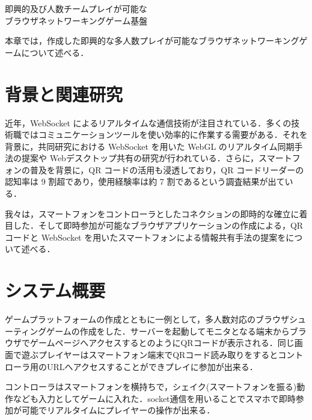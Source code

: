 \chapterhead
{即興的及び人数チームプレイが可能な\\ブラウザネットワーキングゲーム基盤}

{本章では，作成した即興的な多人数プレイが可能なブラウザネットワーキングゲームについて述べる．}



\section{背景と関連研究}

近年，WebSocket\cite{websocket} によるリアルタイムな通信技術が注目されている．多くの技術職ではコミュニケーションツールを使い効率的に作業する需要がある．それを背景に，共同研究における WebSocket を用いた WebGL のリアルタイム同期手法の提案\cite{websocket_webgl}や Webデスクトップ共有の研究が行われている\cite{websocket_desktop}．さらに，スマートフォンの普及\cite{smartphone_share}を背景に，QR コード\cite{qrcode}の活用も浸透しており，QR コードリーダーの認知率は 9 割超であり，使用経験率は約 7 割であるという調査結果が出ている\cite{qrcoderesearch}．

我々は，スマートフォンをコントローラとしたコネクションの即時的な確立に着目した．そして即時参加が可能なブラウザアプリケーションの作成による，QR コードと WebSocket を用いたスマートフォンによる情報共有手法の提案をについて述べる\cite{ec2015}．

\section{システム概要}

ゲームプラットフォームの作成とともに一例として，多人数対応のブラウザシューティングゲームの作成をした．サーバーを起動してモニタとなる端末からブラウザでゲームページへアクセスするとのようにQRコードが表示される．同じ画面で遊ぶプレイヤーはスマートフォン端末でQRコード読み取りをするとコントローラ用のURLへアクセスすることができプレイに参加が出来る．

コントローラはスマートフォンを横持ちで，シェイク(スマートフォンを振る)動作なども入力としてゲームに入れた．socket通信\cite{webpagesocketio}を用いることでスマホで即時参加が可能でリアルタイムにプレイヤーの操作が出来る．


